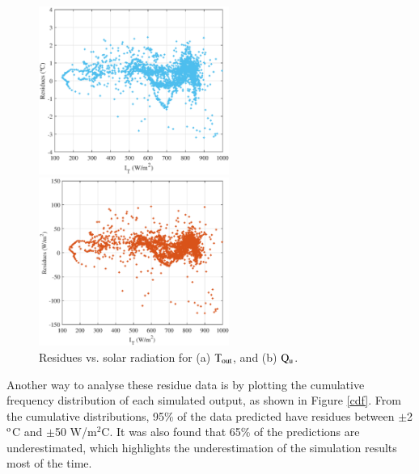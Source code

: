 \begin{figure}[ht!]
	\begin{minipage}{0.49\columnwidth}
		\includegraphics[width=0.95\columnwidth,height=5.5cm]{figs/residueT_it.eps}
	\end{minipage}
	\begin{minipage}{0.49\columnwidth}
		\includegraphics[width=1.0\columnwidth,height=5.5cm]{figs/residueQ_it.eps}
	\end{minipage}
	\caption{Residues vs. solar radiation for (a) $\rm{T_{out}}$, and (b) $\rm{Q_u}$.}
	\label{res_it}
\end{figure}

Another way to analyse these residue data is by plotting the cumulative frequency distribution of each simulated output, as shown in Figure \ref{cdf}. From the cumulative distributions, 95\% of the data predicted have residues between $\pm$2 $^{\rm{o}}$C and $\pm$50 W/m$^{2}$C. It was also found that 65\% of the predictions are underestimated, which highlights the underestimation of the simulation results most of the time.

